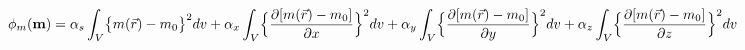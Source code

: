 \vspace{-0.1cm}
\begin{equation}
    \phi_{m}(\mathbf{m}) =\alpha_s \int_V \bigl\{ m(\vec{r}) - m_0 \bigr\}^2 dv \\ + \alpha_x \int_V \Bigl\{ \frac{\partial{[m(\vec{r}) - m_0]}}{\partial{x}} \Bigr\}^2 dv \\ + \alpha_y \int_V \Bigl\{ \frac{\partial{[m(\vec{r}) - m_0]}}{\partial{y}} \Bigr\}^2 dv \\ + \alpha_z \int_V \Bigl\{ \frac{\partial{[m(\vec{r}) - m_0]}}{\partial{z}} \Bigr\}^2 dv
    \label{eq:forward-pass}
    \vspace{-0.05cm}
\end{equation}
